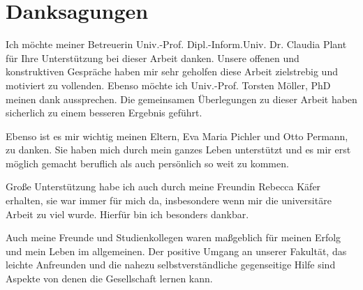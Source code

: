 

\chapter*{Danksagungen} %
\label{cha:acknowledgements}
\noindent

Ich möchte meiner Betreuerin Univ.-Prof. Dipl.-Inform.Univ. Dr. Claudia Plant für Ihre Unterstützung bei dieser Arbeit danken. Unsere offenen und konstruktiven Gespräche haben mir sehr geholfen diese Arbeit zielstrebig und motiviert zu vollenden. Ebenso möchte ich Univ.-Prof. Torsten Möller, PhD meinen dank aussprechen. Die gemeinsamen Überlegungen zu dieser Arbeit haben sicherlich zu einem besseren Ergebnis geführt.

Ebenso ist es mir wichtig meinen Eltern, Eva Maria Pichler und Otto Permann, zu danken. Sie haben mich durch mein ganzes Leben unterstützt und es mir erst möglich gemacht beruflich als auch persönlich so weit zu kommen.

Große Unterstützung habe ich auch durch meine Freundin Rebecca Käfer erhalten, sie war immer für mich da, insbesondere wenn mir die universitäre Arbeit zu viel wurde. Hierfür bin ich besonders dankbar.

Auch meine Freunde und Studienkollegen waren maßgeblich für meinen Erfolg und mein Leben im allgemeinen. Der positive Umgang an unserer Fakultät, das leichte Anfreunden und die nahezu selbstverständliche gegenseitige Hilfe sind Aspekte von denen die Gesellschaft lernen kann.

